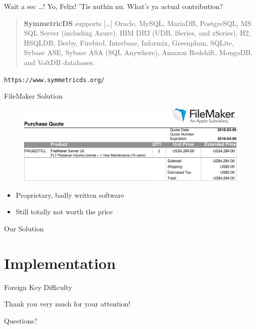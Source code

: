 \documentclass[xcolor=x11names, aspectratio=169,usenames,dvipsnames]{beamer}
\begin{document}
\begin{frame}{Wait a sec \dots!}\large
Yo, Felix! 'Tis nuthin nu. What's ya actual contribution?\pause\bigskip
\normalsize

\begin{quote}
	\textbf{SymmetricDS} supports [\dots] \alert{Oracle}, \alert{MySQL}, MariaDB, \alert{PostgreSQL}, MS SQL Server (including Azure), IBM DB2 (UDB, iSeries, and zSeries), H2, HSQLDB, Derby, Firebird, Interbase, Informix, Greenplum, SQLite, Sybase ASE, Sybase ASA (SQL Anywhere), Amazon Redshift, \alert{MongoDB}, and VoltDB databases.
\end{quote}\vspace{-1em}
\begin{flushright}
	\texttt{https://www.symmetricds.org/}
\end{flushright}
\end{frame}

\begin{frame}{FileMaker Solution}
\begin{figure}
\includegraphics[width=\linewidth]{img/order.png}
\end{figure}\vspace{-2em}
\begin{itemize}
\item Proprietary, badly written software
\item Still totally not worth the price
\end{itemize}
\end{frame}

\begin{frame}{Our Solution}

\end{frame}

\section{Implementation}

\begin{frame}{Foreign Key Difficulty}
\begin{figure}
	\begin{tikzpicture}
	
	\end{tikzpicture}
\end{figure}
\end{frame}

\begin{frame}[plain]
\vfill\vfill\vfill
\begin{center}\Large
Thank you very much for your attention!\\\bigskip

Questions?
\end{center}\vfill\vfill
\end{frame}

\maketitle
\end{document}
